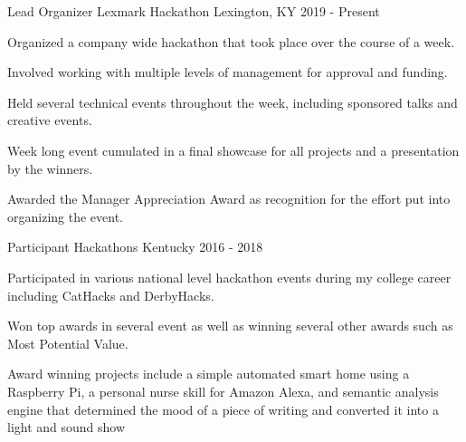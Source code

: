 

\begin{cventries}

  \cventry
    {Lead Organizer} %
    {Lexmark Hackathon} %
    {Lexington, KY} %
    {2019 - Present} %
    {
      \begin{cvitems} %
        \item {Organized a company wide hackathon that took place over the course of a week.}
        \item {Involved working with multiple levels of management for approval and funding.}
        \item {Held several technical events throughout the week, including sponsored talks and creative events.}
	\item {Week long event cumulated in a final showcase for all projects and a presentation by the winners.}
	\item {Awarded the Manager Appreciation Award as recognition for the effort put into organizing the event.}
      \end{cvitems}
    }

  \cventry
    {Participant} %
    {Hackathons} %
    {Kentucky} %
    {2016 - 2018} %
    {
      \begin{cvitems} %
        \item {Participated in various national level hackathon events during my college career including CatHacks and DerbyHacks.}
        \item {Won top awards in several event as well as winning several other awards such as Most Potential Value.}
	\item {Award winning projects include a simple automated smart home using a Raspberry Pi, a personal nurse skill for Amazon Alexa, and semantic analysis engine that determined the mood of a piece of writing and converted it into a light and sound show}
      \end{cvitems}
    }


\end{cventries}
